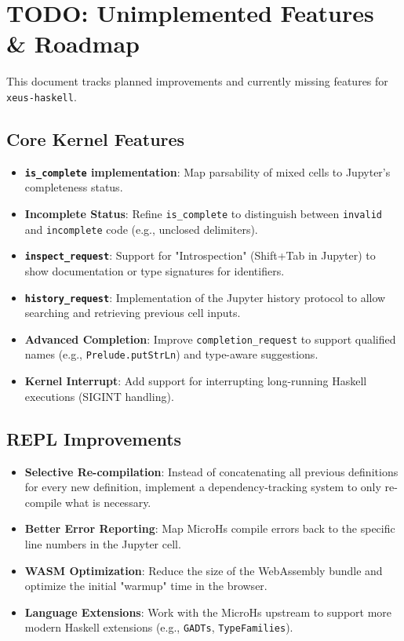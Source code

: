 \section{TODO: Unimplemented Features \& Roadmap}
\label{sec:todo}


This document tracks planned improvements and currently missing features for \texttt{xeus-haskell}.
\subsection{Core Kernel Features}


\begin{itemize}
\item [x] \textbf{\texttt{is\_complete} implementation}: Map parsability of mixed cells to Jupyter's completeness status.
\item [ ] \textbf{Incomplete Status}: Refine \texttt{is\_complete} to distinguish between \texttt{invalid} and \texttt{incomplete} code (e.g., unclosed delimiters).
\item [x] \textbf{\texttt{inspect\_request}}: Support for "Introspection" (Shift+Tab in Jupyter) to show documentation or type signatures for identifiers.
\item [ ] \textbf{\texttt{history\_request}}: Implementation of the Jupyter history protocol to allow searching and retrieving previous cell inputs.
\item [ ] \textbf{Advanced Completion}: Improve \texttt{completion\_request} to support qualified names (e.g., \texttt{Prelude.putStrLn}) and type-aware suggestions.
\item [ ] \textbf{Kernel Interrupt}: Add support for interrupting long-running Haskell executions (SIGINT handling).
\end{itemize}


\subsection{REPL Improvements}


\begin{itemize}
\item [ ] \textbf{Selective Re-compilation}: Instead of concatenating all previous definitions for every new definition, implement a dependency-tracking system to only re-compile what is necessary.
\item [ ] \textbf{Better Error Reporting}: Map MicroHs compile errors back to the specific line numbers in the Jupyter cell.
\item [ ] \textbf{WASM Optimization}: Reduce the size of the WebAssembly bundle and optimize the initial "warmup" time in the browser.
\item [x] \textbf{Language Extensions}: Work with the MicroHs upstream to support more modern Haskell extensions (e.g., \texttt{GADTs}, \texttt{TypeFamilies}).
\end{itemize}


